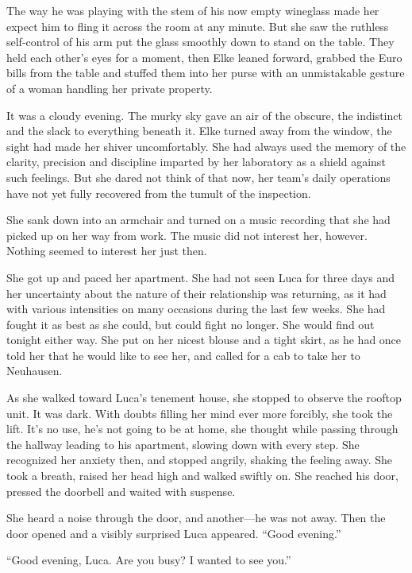The way he was playing with the stem of his now empty wineglass made her expect him to fling it across the room at any minute. But she saw the ruthless self-control of his arm put the glass smoothly down to stand on the table. They held each other's eyes for a moment, then Elke leaned forward, grabbed the Euro bills from the table and stuffed them into her purse with an unmistakable gesture of a woman handling her private property.

\sectionline

It was a cloudy evening. The murky sky gave an air of the obscure, the indistinct and the slack to everything beneath it. Elke turned away from the window, the sight had made her shiver uncomfortably. She had always used the memory of the clarity, precision and discipline imparted by her laboratory as a shield against such feelings. But she dared not think of that now, her team's daily operations have not yet fully recovered from the tumult of the inspection.

She sank down into an armchair and turned on a music recording that she had picked up on her way from work. The music did not interest her, however. Nothing seemed to interest her just then.

She got up and paced her apartment. She had not seen Luca for three days and her uncertainty about the nature of their relationship was returning, as it had with various intensities on many occasions during the last few weeks. She had fought it as best as she could, but could fight no longer. She would find out tonight either way. She put on her nicest blouse and a tight skirt, as he had once told her that he would like to see her, and called for a cab to take her to Neuhausen.

As she walked toward Luca's tenement house, she stopped to observe the rooftop unit. It was dark. With doubts filling her mind ever more forcibly, she took the lift. It's no use, he's not going to be at home, she thought while passing through the hallway leading to his apartment, slowing down with every step. She recognized her anxiety then, and stopped angrily, shaking the feeling away. She took a breath, raised her head high and walked swiftly on. She reached his door, pressed the doorbell and waited with suspense.

She heard a noise through the door, and another---he was not away. Then the door opened and a visibly surprised Luca appeared. ``Good evening.''

``Good evening, Luca. Are you busy? I wanted to see you.''

